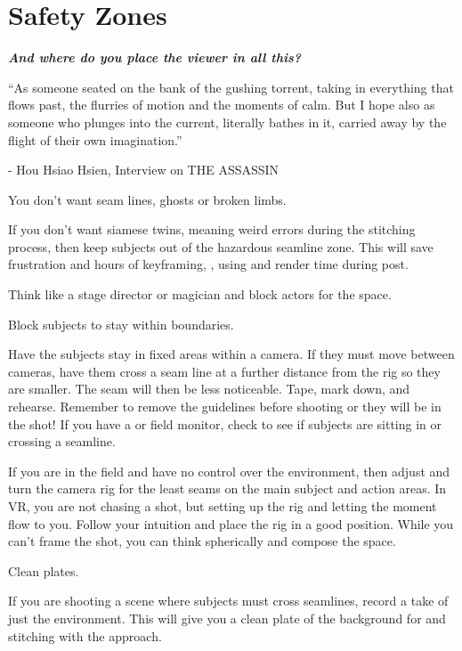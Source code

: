 \section{Safety Zones}
\pagecolor{white}
\label{chap:23}
\begin{fullwidth}

{\itshape\bfseries And where do you place the viewer in all this?

“As someone seated on the bank of the gushing torrent, taking in everything that flows past, the flurries of motion and the moments of calm. But I hope also as someone who plunges into the current, literally bathes in it, carried away by the flight of their own imagination.”}

- Hou Hsiao Hsien, Interview on THE ASSASSIN
\vspace{\baselineskip}

\problem

{\large You don’t want seam lines, ghosts or broken limbs. \par}

If you don’t want siamese twins, meaning weird errors during the stitching process, then keep subjects out of the hazardous seamline zone. This will save frustration and hours of keyframing, \textbf{}, using \textbf{} and render time during post. 

Think like a stage director or magician and block actors for the space. 


\solution

{\large Block subjects to stay within boundaries. \par}

Have the subjects stay in fixed areas within a camera. If they must move between cameras, have them cross a seam line at a further distance from the rig so they are smaller. The seam will then be less noticeable. Tape, mark down, and rehearse. Remember to remove the guidelines before shooting or they will be in the shot! If you have a \textbf{} or field monitor, check to see if subjects are sitting in or crossing a seamline. 
\clearpage
{}

If you are in the field and have no control over the environment, then adjust and turn the camera rig for the least seams on the main subject and action areas. In VR, you are not chasing a shot, but setting up the rig and letting the moment flow to you. Follow your intuition and place the rig in a good position. While you can’t frame the shot, you can think spherically and compose the space. 

{\large Clean plates. \par}

If you are shooting a scene where subjects must cross seamlines, record a take of just the environment. This will give you a clean plate of the background for \textbf{} and stitching with the \textbf{} approach. 


\clearpage
\end{fullwidth}
